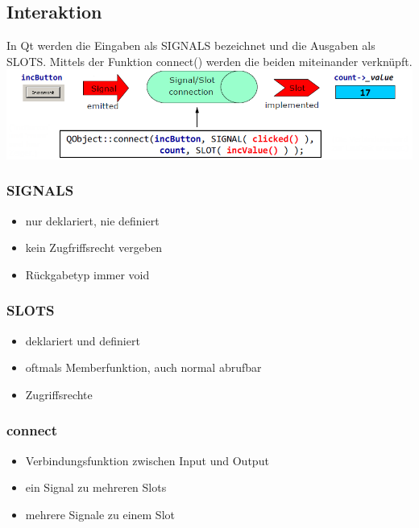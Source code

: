\subsection{Interaktion}
In Qt werden die Eingaben als SIGNALS bezeichnet und die Ausgaben als SLOTS. Mittels der Funktion connect() werden die beiden miteinander verknüpft.\\
\includegraphics[width=15cm]{images/connect.png}

\begin{multicols}{3}
\subsubsection{SIGNALS}
\begin{itemize}
	\item nur deklariert, nie definiert
	\item kein Zugfriffsrecht vergeben
	\item Rückgabetyp immer void
\end{itemize}

\subsubsection{SLOTS}
\begin{itemize}
	\item deklariert und definiert
	\item oftmals Memberfunktion, auch normal abrufbar
	\item Zugriffsrechte
\end{itemize}

\subsubsection{connect}
\begin{itemize}
	\item Verbindungsfunktion zwischen Input und Output
	\item ein Signal zu mehreren Slots
	\item mehrere Signale zu einem Slot
\end{itemize}
\end{multicols}

